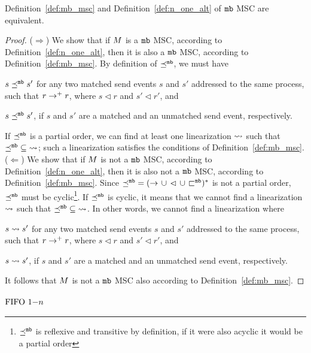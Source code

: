 \begin{proposition}
    Definition~\ref{def:mb_msc} and Definition~\ref{def:n_one_alt} of $\mathtt{mb}$ MSC are equivalent.
\end{proposition}
\begin{proof}
    ($\Rightarrow$)  We show that if $M$ is a $\mathtt{mb}$ MSC, according to Definition~\ref{def:n_one_alt}, then it is also a $\mathtt{mb}$ MSC, according to Definition~\ref{def:mb_msc}. By definition of $\preceq^{\mathtt{mb}}$, we must have 
    \begin{enumerate*}[label={(\roman*)}]
        \item $s \preceq^{\mathtt{mb}} s'$ for any two matched send events $s$ and $s'$ addressed to the same process, such that $r \to^+ r$, where $s \lhd r$ and $s' \lhd r'$, and
        \item $s \preceq^{\mathtt{mb}} s'$, if $s$ and $s'$ are a matched and an unmatched send event, respectively.
    \end{enumerate*} 
    If $\preceq^{\mathtt{mb}}$ is a partial order, we can find at least one linearization $\rightsquigarrow$ such that $\preceq^{\mathtt{mb}} \;\subseteq\; \rightsquigarrow$; such a linearization satisfies the conditions of Definition~\ref{def:mb_msc}.\newline
    ($\Leftarrow$) We show that if $M$ is not a $\mathtt{mb}$ MSC, according to Definition~\ref{def:n_one_alt}, then it is also not a $\mathtt{mb}$ MSC, according to Definition~\ref{def:mb_msc}. Since ${\preceq^{\mathtt{mb}}} = ({\to} \,\cup\, {\lhd} \,\cup\, {\sqsubset^{\mathtt{mb}}})^\ast$ is not a partial order, $\preceq^{\mathtt{mb}}$ must be cyclic\footnote{$\preceq^{\mathtt{mb}}$ is reflexive and transitive by definition, if it were also acyclic it would be a partial order}. If $\preceq^{\mathtt{mb}}$ is cyclic, it means that we cannot find a linearization $\rightsquigarrow$ such that $\preceq^{\mathtt{mb}} \;\subseteq\; \rightsquigarrow$. In other words, we cannot find a linearization where      
    \begin{enumerate*}[label={(\roman*)}]
        \item $s \rightsquigarrow s'$ for any two matched send events $s$ and $s'$ addressed to the same process, such that $r \to^+ r$, where $s \lhd r$ and $s' \lhd r'$, and
        \item $s \rightsquigarrow s'$, if $s$ and $s'$ are a matched and an unmatched send event, respectively.
    \end{enumerate*} 
    It follows that $M$ is not a $\mathtt{mb}$ MSC also according to Definition~\ref{def:mb_msc}.
\end{proof}

\paragraph*{\bf $\text{FIFO } 1\mathsf{-}n$}

